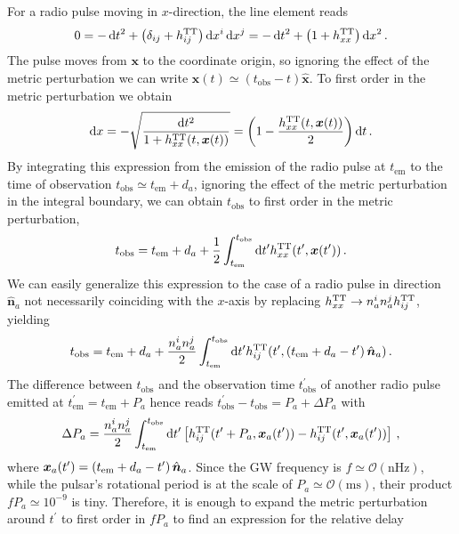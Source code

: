For a radio pulse moving in $x$-direction, the line element reads 
\begin{align}
	0 = - \mathop{}\!\mathrm{d} t^2 +\left(  \delta_{ij} + h_{ij}^{\text{TT}} \right) \mathop{}\!\mathrm{d} x^i \mathop{}\!\mathrm{d} x^j = - \mathop{}\!\mathrm{d} t^2 +\left(  1 + h_{xx}^{\text{TT}} \right) \mathop{}\!\mathrm{d} x^2 \, .
\end{align}
The pulse moves from $\bm{x}$ to the coordinate origin, so ignoring the effect of the metric perturbation we can write $\bm{x}(t) \simeq (t_\text{obs} - t) \hat{\bm{x}}$. To first order in the metric perturbation we obtain
\begin{align}
	\mathop{}\!\mathrm{d} x = - \sqrt{\frac{\mathop{}\!\mathrm{d} t^2}{1 + h_{xx}^{\text{TT}}(t, \bm{x}(t))}} = \left( 1 - \frac{h_{xx}^{\text{TT}}(t,\bm{x}(t))}{2} \right) \mathop{}\!\mathrm{d} t \, .
\end{align}
By integrating this expression from the emission of the radio pulse at $t_\text{em}$ to the time of observation $t_\text{obs} \simeq t_\text{em} + d_a$, ignoring the effect of the metric perturbation in the integral boundary, we can obtain $t_\text{obs}$ to first order in the metric perturbation,
\begin{align}
	t_\text{obs} = t_\text{em} + d_a + \frac{1}{2} \int_{t_{\text{em}}}^{t_{\text{obs}}} \mathop{}\!\mathrm{d} t^\prime h_{xx}^{\text{TT}}(t^\prime,\bm{x}(t^\prime)) \, . 
\end{align}
We can easily generalize this expression to  the case of a radio pulse in direction $\hat{\bm{n}}_a$ not necessarily coinciding with the $x$-axis by replacing $h_{xx}^{\text{TT}} \rightarrow n_a^i n_a^j h_{ij}^{\text{TT}}$, yielding 
\begin{align}
	t_\text{obs} = t_\text{em} + d_a + \frac{n_a^i n_a^j}{2} \int_{t_{\text{em}}}^{t_{\text{obs}}} \mathop{}\!\mathrm{d} t^\prime h_{ij}^{\text{TT}}(t^\prime,\left( t_\text{em} + d_a - t^\prime \right) \hat{\bm{n}}_a) \, . 
\end{align}
The difference between $t_\text{obs}$ and the observation time $t_\text{obs}^\prime$ of another  radio pulse emitted at $t_\text{em}^\prime = t_\text{em} + P_a$ hence reads $t_\text{obs}^\prime - t_\text{obs} = P_a + \Delta P_a$ with 
\begin{align}
	\Delta P_a = \frac{n_a^i n_a^j}{2} \int_{t_{\text{em}}}^{t_{\text{obs}}} \mathop{}\!\mathrm{d} t^\prime \left[  h_{ij}^{\text{TT}}(t^\prime + P_a, \bm{x}_a(t^\prime)) -h_{ij}^{\text{TT}}(t^\prime, \bm{x}_a(t^\prime)) \right]  \, ,
\end{align}
where $\bm{x}_a(t^\prime) = \left( t_\text{em} + d_a - t^\prime \right) \hat{\bm{n}}_a$. Since the \ac{GW} frequency is $f\simeq \mathcal{O}(\text{nHz})$, while the pulsar's rotational period is at the scale of $P_a \simeq \mathcal{O}(\text{ms})$, their product $f P_a \simeq 10^{-9}$ is tiny. Therefore, it is enough to expand the metric perturbation around $t^\prime$ to first order in $f P_a$ to find an expression for the relative delay
